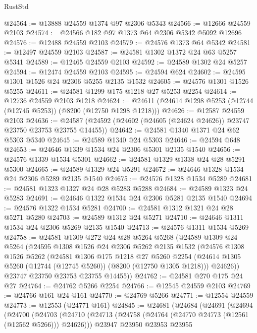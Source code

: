 \begin{lexlean}{RustStd}
\begin{coremodule}
@24564 := @13888 @24559 @1374 @97 @2306 @5343
@24566 := @12666 @24559 @2103
@24574 := @24566 @182 @97 @1373 @64 @2306 @5342 @5092 @12696
@24576 := @12488 @24559 @2103
@24579 := @24576 @1373 @64 @5342
@24581 := @12497 @24559 @2103
@24587 := @24581 @1302 @1372 @24 @63 @5257 @5341
@24589 := @12465 @24559 @2103
@24592 := @24589 @1302 @24 @5257
@24594 := @12474 @24559 @2103
@24595 := @24594 @624
@24602 := @24595 @1301 @1526 @24 @2306 @5255 @2135 @1532
@24605 := @24576 @1301 @1526 @5255
@24611 := @24581 @1299 @175 @1218 @27 @5253 @2254
@24614 := @12736 @24559 @2103 @1218
@24624 := @24611 (@24614 @1298 @5253 (@12744 (@12745 @5253)) (@8200 (@12750 @1298 @1218)))
@24626 := @12587 @24559 @2103
@24636 := @24587 (@24592 (@24602 (@24605 (@24624 @24626)) @23747 @23750 @23753 @23755 @14455))
@24642 := @24581 @1340 @1371 @24 @62 @5303 @5340
@24645 := @24589 @1340 @24 @5303
@24646 := @24594 @648
@24653 := @24646 @1339 @1534 @24 @2306 @5301 @2135 @1540
@24656 := @24576 @1339 @1534 @5301
@24662 := @24581 @1329 @1338 @24 @28 @5291 @5300
@24665 := @24589 @1329 @24 @5291
@24672 := @24646 @1328 @1534 @24 @2306 @5289 @2135 @1540
@24675 := @24576 @1328 @1534 @5289
@24681 := @24581 @1323 @1327 @24 @28 @5283 @5288
@24684 := @24589 @1323 @24 @5283
@24691 := @24646 @1322 @1534 @24 @2306 @5281 @2135 @1540
@24694 := @24576 @1322 @1534 @5281
@24700 := @24581 @1312 @1321 @24 @28 @5271 @5280
@24703 := @24589 @1312 @24 @5271
@24710 := @24646 @1311 @1534 @24 @2306 @5269 @2135 @1540
@24713 := @24576 @1311 @1534 @5269
@24758 := @24581
    @1309
    @272
    @24
    @28
    @5264
    @5268
    (@24589
      @1309
      @24
      @5264
      (@24595
        @1308
        @1526
        @24
        @2306
        @5262
        @2135
        @1532
        (@24576
          @1308
          @1526
          @5262
          (@24581
            @1306
            @175
            @1218
            @27
            @5260
            @2254
            (@24614 @1305 @5260 (@12744 (@12745 @5260)) (@8200 (@12750 @1305 @1218)))
            @24626))
        @23747
        @23750
        @23753
        @23755
        @14455))
@24762 := @24581 @270 @175 @24 @27
@24764 := @24762 @5266 @2254
@24766 := @12545 @24559 @2103
@24769 := @24766 @161 @24 @161
@24770 := @24769 @5266
@24771 := @12554 @24559
@24773 := @12553 (@24771 @161)
@24845 := @24681
    (@24684
      (@24691
        (@24694
          (@24700
            (@24703
              (@24710
                (@24713 (@24758 (@24764 (@24770 @24773 (@12561 (@12562 @5266))) @24626)))
                @23947
                @23950
                @23953
                @23955

\end{coremodule}
\end{lexlean}
